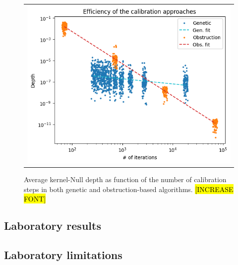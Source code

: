 \documentclass{aa}
\begin{document}
            \begin{figure}
                \begin{center}
                \begin{tabular}{c}
                \includegraphics[width=\linewidth]{img/method_comparison.png}
                \end{tabular}
                \end{center}
                \caption[method comparison] 
                { \label{fig:method_comparison} 
                Average kernel-Null depth as function of the number of calibration steps in both genetic and obstruction-based algorithms. \hl{[INCREASE FONT]}}
            \end{figure}
        
        \subsection{Laboratory results}

        \subsection{Laboratory limitations}
    
\end{document}
